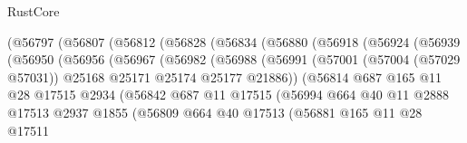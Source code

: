 \begin{lexlean}{RustCore}
\begin{coremodule}
                  (@56797
                    (@56807
                      (@56812
                        (@56828
                          (@56834
                            (@56880
                              (@56918
                                (@56924
                                  (@56939
                                    (@56950
                                      (@56956
                                        (@56967
                                          (@56982
                                            (@56988
                                              (@56991
                                                (@57001
                                                  (@57004 (@57029 @57031))
                                                  @25168
                                                  @25171
                                                  @25174
                                                  @25177
                                                  @21886))
                                              (@56814
                                                @687
                                                @165
                                                @11
                                                @28
                                                @17515
                                                @2934
                                                (@56842
                                                  @687
                                                  @11
                                                  @17515
                                                  (@56994
                                                    @664
                                                    @40
                                                    @11
                                                    @2888
                                                    @17513
                                                    @2937
                                                    @1855
                                                    (@56809
                                                      @664
                                                      @40
                                                      @17513
                                                      (@56881
                                                        @165
                                                        @11
                                                        @28
                                                        @17511

\end{coremodule}
\end{lexlean}
